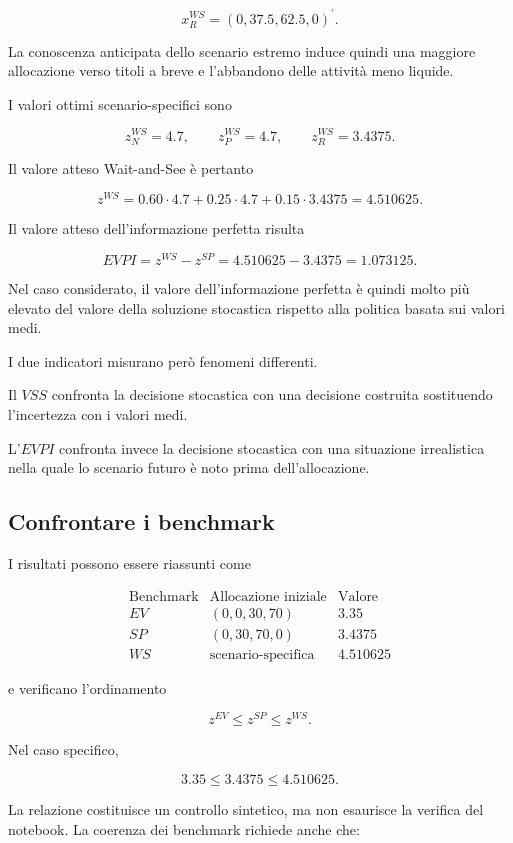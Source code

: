 \[
x_R^{WS}
=
(0,37.5,62.5,0)^{\prime}.
\]

La conoscenza anticipata dello scenario estremo induce quindi una maggiore
allocazione verso titoli a breve e l'abbandono delle attivit\`a meno liquide.

I valori ottimi scenario-specifici sono

\[
z_N^{WS}=4.7,
\qquad
z_P^{WS}=4.7,
\qquad
z_R^{WS}=3.4375.
\]

Il valore atteso Wait-and-See \`e pertanto

\[
z^{WS}
=
0.60\cdot 4.7
+
0.25\cdot 4.7
+
0.15\cdot 3.4375
=
4.510625.
\]

Il valore atteso dell'informazione perfetta risulta

\[
EVPI
=
z^{WS}-z^{SP}
=
4.510625-3.4375
=
1.073125.
\]

Nel caso considerato, il valore dell'informazione perfetta \`e quindi molto
pi\`u elevato del valore della soluzione stocastica rispetto alla politica
basata sui valori medi.

I due indicatori misurano per\`o fenomeni differenti.

Il \(VSS\) confronta la decisione stocastica con una decisione costruita
sostituendo l'incertezza con i valori medi.

L'\(EVPI\) confronta invece la decisione stocastica con una situazione
irrealistica nella quale lo scenario futuro \`e noto prima dell'allocazione.

\subsection{Confrontare i benchmark}

I risultati possono essere riassunti come

\[
\begin{array}{c|c|c}
\text{Benchmark}
&
\text{Allocazione iniziale}
&
\text{Valore}
\\ \hline
EV
&
(0,0,30,70)
&
3.35
\\
SP
&
(0,30,70,0)
&
3.4375
\\
WS
&
\text{scenario-specifica}
&
4.510625
\end{array}
\]

\noindent e verificano l'ordinamento

\[
z^{EV}
\leq
z^{SP}
\leq
z^{WS}.
\]

Nel caso specifico,

\[
3.35
\leq
3.4375
\leq
4.510625.
\]

La relazione costituisce un controllo sintetico, ma non esaurisce la verifica
del notebook. La coerenza dei benchmark richiede anche che:

